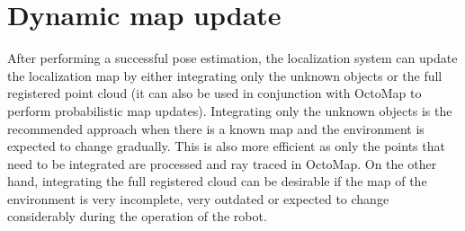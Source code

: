 \section{Dynamic map update}

After performing a successful pose estimation, the localization system can update the localization map by either integrating only the unknown objects or the full registered point cloud (it can also be used in conjunction with OctoMap \cite{Hornung2013} to perform probabilistic map updates). Integrating only the unknown objects is the recommended approach when there is a known map and the environment is expected to change gradually. This is also more efficient as only the points that need to be integrated are processed and ray traced in OctoMap. On the other hand, integrating the full registered cloud can be desirable if the map of the environment is very incomplete, very outdated or expected to change considerably during the operation of the robot.
